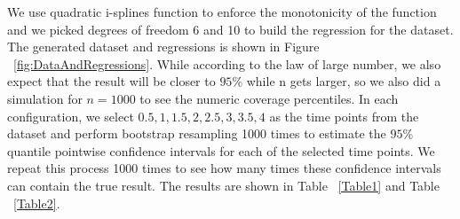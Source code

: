 \documentclass[12pt]{article}
\begin{document}
We use quadratic i-splines function to enforce the monotonicity of the function and we picked degrees of freedom 6 and 10 to build the regression for the dataset. The generated dataset and regressions is shown in Figure ~\ref{fig:DataAndRegressions}. While according to the law of large number, we also expect that the result will be closer to \(95\%\) while n gets larger, so we also did a simulation for \(n = 1000\) to see the numeric coverage percentiles. In each configuration, we select \(0.5,1,1.5,2,2.5,3,3.5,4\) as the time points from the dataset and perform bootstrap resampling 1000 times to estimate the \(95\%\) quantile pointwise confidence intervals for each of the selected time points. We repeat this process 1000 times to see how many times these confidence intervals can contain the true result. The results are shown in Table ~\ref{Table1} and Table ~\ref{Table2}. 
\end{document}
